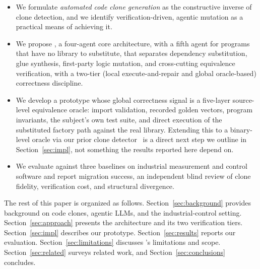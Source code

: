 \begin{itemize}
    \item We formulate \emph{automated code clone generation} as the constructive inverse of clone detection, and we identify verification-driven, agentic mutation as a practical means of achieving it.
    \item We propose \sys, a four-agent core architecture, with a fifth agent for programs that have no library to substitute, that separates dependency substitution, glue synthesis, first-party logic mutation, and cross-cutting equivalence verification, with a two-tier (local execute-and-repair and global oracle-based) correctness discipline.
    \item We develop a prototype whose global correctness signal is a five-layer source-level equivalence oracle: import validation, recorded golden vectors, program invariants, the subject's own test suite, and direct execution of the substituted factory path against the real library. Extending this to a binary-level oracle via our prior clone detector~\cite{agadakos2025bcd} is a direct next step we outline in Section~\ref{sec:impl}, not something the results reported here depend on.
    \item We evaluate \sys against three baselines on industrial measurement and control software and report migration success, an independent blind review of clone fidelity, verification cost, and structural divergence.
\end{itemize}

The rest of this paper is organized as follows. Section~\ref{sec:background} provides background on code clones, agentic LLMs, and the industrial-control setting. Section~\ref{sec:approach} presents the \sys architecture and its two verification tiers. Section~\ref{sec:impl} describes our prototype. Section~\ref{sec:results} reports our evaluation. Section~\ref{sec:limitations} discusses \sys's limitations and scope. Section~\ref{sec:related} surveys related work, and Section~\ref{sec:conclusions} concludes.
